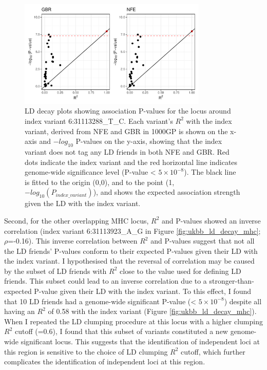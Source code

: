   \begin{figure}[H] 
    \centering    
    \includegraphics[width=0.8\textwidth]{ukbb_ld_decay_nfe_vs_gbr}
    \caption[LD decay plots for the pAD-associated locus with index variant 6:31113288\_T\_C with LD computed from NFE and GBR]{LD decay plots showing association P-values for the locus around index variant 6:31113288\_T\_C. Each variant's $R^{2}$ with the index variant, derived from NFE and GBR in 1000GP is shown on the x-axis and $-log_{10}$ P-values on the y-axis, showing that the index variant does not tag any LD friends in both NFE and GBR. Red dots indicate the index variant and the red horizontal line indicates genome-wide significance level (P-value < $5\times10^{-8}$). The black line is fitted to the origin (0,0), and to the point (1,$-log_{10}(P_{index\_variant})$), and shows the expected association strength given the LD with the index variant.}
    \label{fig:ukbb_ld_decay_nfe_vs_gbr}
    \end{figure}

  Second, for the other overlapping MHC locus, $R^{2}$ and P-values showed an inverse correlation (index variant 6:31113923\_A\_G in Figure \ref{fig:ukbb_ld_decay_mhc}; $\rho$=-0.16).  This inverse correlation between $R^{2}$ and P-values suggest that not all the LD friends' P-values conform to their expected P-values given their LD with the index variant. I hypothesised that the reversal of correlation may be caused by the subset of LD friends with $R^{2}$ close to the value used for defining LD friends. This subset could lead to an inverse correlation due to a stronger-than-expected P-value given their LD with the index variant. To this effect, I found that 10 LD friends had a genome-wide significant P-value (< $5\times10^{-8}$) despite all having an $R^{2}$ of 0.58 with the index variant (Figure \ref{fig:ukbb_ld_decay_mhc}). When I repeated the LD clumping procedure at this locus with a higher clumping $R^{2}$ cutoff (=0.6), I found that this subset of variants constituted a new genome-wide significant locus. This suggests that the identification of independent loci at this region is sensitive to the choice of LD clumping $R^{2}$ cutoff, which further complicates the identification of independent loci at this region. 
  

